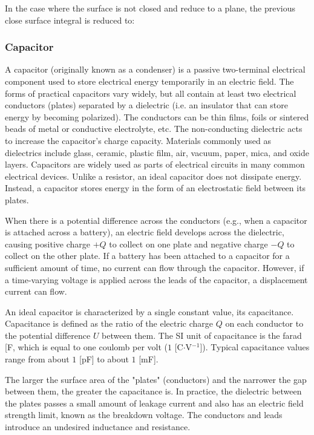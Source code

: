 	In the case where the surface is not closed and reduce to a plane, the previous close surface integral is reduced to:
	
	
	\subsubsection{Capacitor}\label{capacitor}
	A capacitor (originally known as a condenser) is a passive two-terminal electrical component used to store electrical energy temporarily in an electric field. The forms of practical capacitors vary widely, but all contain at least two electrical conductors (plates) separated by a dielectric (i.e. an insulator that can store energy by becoming polarized). The conductors can be thin films, foils or sintered beads of metal or conductive electrolyte, etc. The non-conducting dielectric acts to increase the capacitor's charge capacity. Materials commonly used as dielectrics include glass, ceramic, plastic film, air, vacuum, paper, mica, and oxide layers. Capacitors are widely used as parts of electrical circuits in many common electrical devices. Unlike a resistor, an ideal capacitor does not dissipate energy. Instead, a capacitor stores energy in the form of an electrostatic field between its plates.

	When there is a potential difference across the conductors (e.g., when a capacitor is attached across a battery), an electric field develops across the dielectric, causing positive charge $+Q$ to collect on one plate and negative charge $-Q$ to collect on the other plate. If a battery has been attached to a capacitor for a sufficient amount of time, no current can flow through the capacitor. However, if a time-varying voltage is applied across the leads of the capacitor, a displacement current can flow.

An ideal capacitor is characterized by a single constant value, its capacitance. Capacitance is defined as the ratio of the electric charge $Q$ on each conductor to the potential difference $U$ between them. The SI unit of capacitance is the farad [F, which is equal to one coulomb per volt ($1$ [C$\cdot$V$^{-1}$]). Typical capacitance values range from about $1$ [pF] to about $1$ [mF].

	The larger the surface area of the "plates" (conductors) and the narrower the gap between them, the greater the capacitance is. In practice, the dielectric between the plates passes a small amount of leakage current and also has an electric field strength limit, known as the breakdown voltage. The conductors and leads introduce an undesired inductance and resistance.

